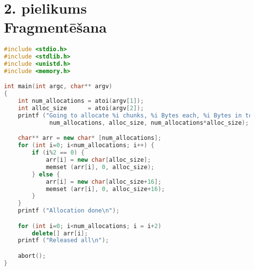 \newpage
\chapter[3. pielikums. Fragmentēšana] {2. pielikums \\  Fragmentēšana}


\begin{lstlisting}[language=C++]
#include <stdio.h>
#include <stdlib.h>
#include <unistd.h>
#include <memory.h>

int main(int argc, char** argv)
{
	int num_allocations = atoi(argv[1]);
	int alloc_size      = atoi(argv[2]);
	printf ("Going to allocate %i chunks, %i Bytes each, %i Bytes in total\n",
	         num_allocations, alloc_size, num_allocations*alloc_size);

	char** arr = new char* [num_allocations];
	for (int i=0; i<num_allocations; i++) {
		if (i%2 == 0) {
			arr[i] = new char[alloc_size];
			memset (arr[i], 0, alloc_size);
		} else {
			arr[i] = new char[alloc_size+16];
			memset (arr[i], 0, alloc_size+16);
		}
	}
	printf ("Allocation done\n");

	for (int i=0; i<num_allocations; i = i+2)
		delete[] arr[i];
	printf ("Released all\n");

	abort();
} 
\end{lstlisting}

